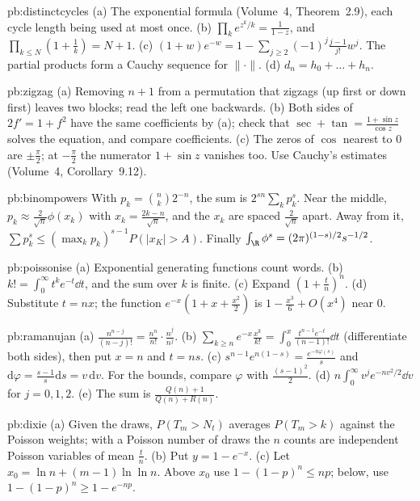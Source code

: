 \begin{hint}{pb:distinctcycles}
(a) The exponential formula (Volume~4, Theorem~2.9), each cycle length being used at most once. (b) $\prod_ke^{z^k/k}=\frac1{1-z}$, and $\prod_{k\le N}(1+\frac1k)=N+1$.
(c) $(1+w)e^{-w}=1-\sum_{j\ge2}(-1)^j\frac{j-1}{j!}w^j$. The partial products form a Cauchy sequence for $\|\cdot\|$. (d) $d_n=h_0+\dots+h_n$.
\end{hint}

\begin{hint}{pb:zigzag}
(a) Removing $n+1$ from a permutation that zigzags (up first or down first) leaves two blocks; read the left one backwards. (b) Both sides of $2f'=1+f^2$ have the
same coefficients by (a); check that $\sec+\tan=\frac{1+\sin z}{\cos z}$ solves the equation, and compare coefficients. (c) The zeros of $\cos$ nearest to $0$ are $\pm\frac\pi2$; at
$-\frac\pi2$ the numerator $1+\sin z$ vanishes too. Use Cauchy's estimates (Volume~4, Corollary~9.12).
\end{hint}

\begin{hint}{pb:binompowers}
With $p_k=\binom nk2^{-n}$, the sum is $2^{sn}\sum_kp_k^s$. Near the middle, $p_k\approx\frac2{\sqrt n}\phi(x_k)$ with $x_k=\frac{2k-n}{\sqrt n}$, and the $x_k$ are spaced $\frac2{\sqrt n}$ apart.
Away from it, $\sum p_k^s\le(\max_kp_k)^{s-1}P(|x_K|>A)$. Finally $\int_\R\phi^s=(2\pi)^{(1-s)/2}s^{-1/2}$.
\end{hint}

\begin{hint}{pb:poissonise}
(a) Exponential generating functions count words. (b) $k!=\int_0^\infty t^ke^{-t}\dd t$, and the sum over $k$ is finite. (c) Expand $(1+\frac tn)^n$. (d) Substitute $t=nx$; the
function $e^{-x}(1+x+\frac{x^2}2)$ is $1-\frac{x^3}6+O(x^4)$ near $0$.
\end{hint}

\begin{hint}{pb:ramanujan}
(a) $\frac{n^{n-j}}{(n-j)!}=\frac{n^n}{n!}\cdot\frac{n^{\underline j}}{n^j}$. (b) $\sum_{k\ge n}e^{-x}\frac{x^k}{k!}=\int_0^x\frac{t^{n-1}e^{-t}}{(n-1)!}\dd t$ (differentiate both sides), then put $x=n$ and $t=ns$. (c) $s^{n-1}e^{n(1-s)}=\frac{e^{-n\varphi(s)}}s$
and $\mathrm d\varphi=\frac{s-1}s\mathrm ds=v\,\mathrm dv$. For the bounds, compare $\varphi$ with $\frac{(s-1)^2}2$. (d) $n\int_0^\infty v^je^{-nv^2/2}\dd v$ for $j=0,1,2$. (e) The sum is
$\frac{Q(n)+1}{Q(n)+R(n)}$.
\end{hint}

\begin{hint}{pb:dixie}
(a) Given the draws, $P(T_m>N_t)$ averages $P(T_m>k)$ against the Poisson weights; with a Poisson number of draws the $n$ counts are independent Poisson
variables of mean $\frac tn$. (b) Put $y=1-e^{-x}$. (c) Let $x_0=\ln n+(m-1)\ln\ln n$. Above $x_0$ use $1-(1-p)^n\le np$; below, use $1-(1-p)^n\ge1-e^{-np}$.
\end{hint}

